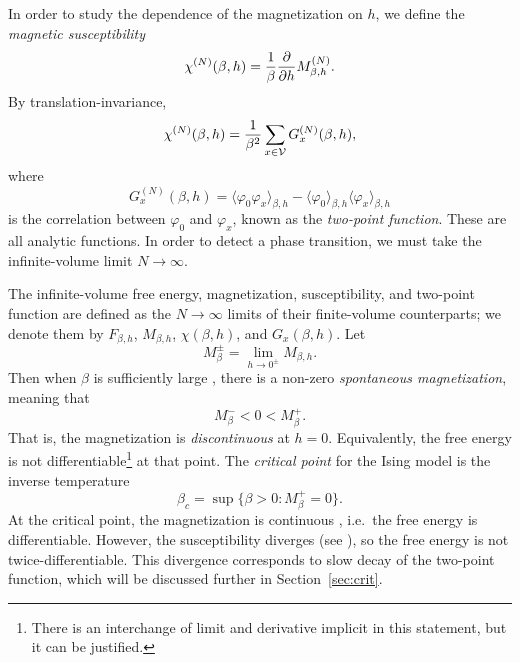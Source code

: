 In order to study the dependence of the magnetization on $h$, we define the
\emph{magnetic susceptibility}
\begin{equation}
\chi^{(N)}(\beta, h)
	=
\frac{1}{\beta} \frac{\partial }{\partial h} M^{(N)}_{\beta,h}.
\end{equation}
By translation-invariance,
\begin{equation}
\label{e:Ising-suscept}
\chi^{(N)}(\beta, h)
	=
\frac{1}{\beta^2}
\sum_{x\in\mathcal{V}} G^{(N)}_x(\beta, h),
\end{equation}
where
\begin{equation}
\label{e:Ising-2pt}
G^{(N)}_x(\beta, h)
	=
\langle \varphi_0 \varphi_x \rangle_{\beta,h}
	-
\langle\varphi_0\rangle_{\beta,h} \langle\varphi_x\rangle_{\beta,h}
\end{equation}
is the correlation between $\varphi_0$ and $\varphi_x$, known as the \emph{two-point function}.
These are all analytic functions.
In order to detect a phase transition, we must take the infinite-volume limit $N\to\infty$.

The infinite-volume free energy, magnetization, susceptibility, and two-point function
are defined as the $N\to\infty$ limits of their finite-volume counterparts; we denote them by
$F_{\beta,h}$, $M_{\beta,h}$, $\chi(\beta, h)$, and $G_x(\beta, h)$.
Let
\begin{equation}
M^\pm_{\beta} = \lim_{h\to0^\pm} M_{\beta,h}.
\end{equation}
Then when $\beta$ is sufficiently large \cite{Peierls36,Griffiths64}, there is a non-zero
\emph{spontaneous magnetization}, meaning that
\begin{equation}
M^-_\beta < 0 < M^+_\beta.
\end{equation}
That is, the magnetization is \emph{discontinuous} at $h = 0$. Equivalently, the free energy
is not differentiable\footnote{There is an interchange of limit and derivative implicit in
this statement, but it can be justified.} at that point. The \emph{critical point} for the
Ising model is the inverse temperature
\begin{equation}
\beta_c = \sup\{\beta > 0 : M^+_\beta = 0 \}.
\end{equation}
At the critical point, the magnetization is continuous \cite{Yang52,AF86}, i.e.\ the free energy
is differentiable. However, the susceptibility diverges (see \cite{ADS15}), so the free energy
is not twice-differentiable. This divergence corresponds to slow decay
of the two-point function, which will be discussed further in Section~\ref{sec:crit}.

